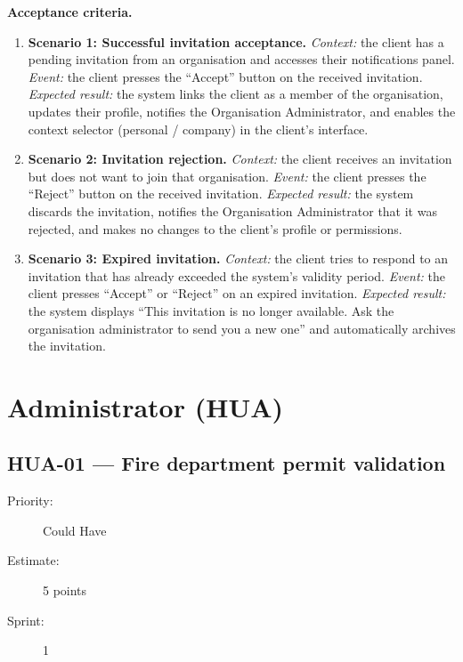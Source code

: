 \documentclass[11pt,a4paper,oneside]{report}
\begin{document}
\textbf{Acceptance criteria.}
\begin{enumerate}
\item \textbf{Scenario 1: Successful invitation acceptance.} \emph{Context:} the client has a pending invitation from an organisation and accesses their notifications panel. \emph{Event:} the client presses the ``Accept'' button on the received invitation. \emph{Expected result:} the system links the client as a member of the organisation, updates their profile, notifies the Organisation Administrator, and enables the context selector (personal / company) in the client's interface.
\item \textbf{Scenario 2: Invitation rejection.} \emph{Context:} the client receives an invitation but does not want to join that organisation. \emph{Event:} the client presses the ``Reject'' button on the received invitation. \emph{Expected result:} the system discards the invitation, notifies the Organisation Administrator that it was rejected, and makes no changes to the client's profile or permissions.
\item \textbf{Scenario 3: Expired invitation.} \emph{Context:} the client tries to respond to an invitation that has already exceeded the system's validity period. \emph{Event:} the client presses ``Accept'' or ``Reject'' on an expired invitation. \emph{Expected result:} the system displays ``This invitation is no longer available. Ask the organisation administrator to send you a new one'' and automatically archives the invitation.
\end{enumerate}

\section{Administrator (HUA)}

\subsection{HUA-01 --- Fire department permit validation}
\label{req:HUA-01}
\begin{description}
\item[Priority:] Could Have \quad \item[Estimate:] 5 points \quad \item[Sprint:] 1
\end{description}
\end{document}
